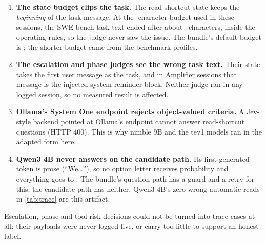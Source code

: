 \begin{enumerate}
  \item \textbf{The state budget clips the task.} The read-shortcut state keeps the \emph{beginning} of the
    task message. At the \TrStateBudget-character budget used in these sessions, the SWE-bench task text
    ended after about \TrTaskSeen\ characters, inside the operating rules, so the judge never saw the issue.
    The bundle's default budget is \TrStateDefault; the shorter budget came from the benchmark profiles.
  \item \textbf{The escalation and phase judges see the wrong task text.} Their state takes the first user
    message as the task, and in Amplifier sessions that message is the injected system-reminder block.
    Neither judge ran in any logged session, so no measured result is affected.
  \item \textbf{Ollama's System One endpoint rejects object-valued criteria.} A Jev-style backend pointed at
    Ollama's endpoint cannot answer read-shortcut questions (HTTP 400). This is why nimble 9B and the tev1
    models ran in the adapted form here.
  \item \textbf{Qwen3 4B never answers on the candidate path.} Its first generated token is prose
    (``We\dots''), so no option letter receives probability and everything goes to . The
    bundle's question path has a guard and a retry for this; the candidate path has neither. Qwen3 4B's
    zero wrong automatic reads in \cref{tab:trace} are this artifact.
\end{enumerate}
Escalation, phase and tool-risk decisions could not be turned into trace cases at all: their payloads were
never logged live, or carry too little to support an honest label.
